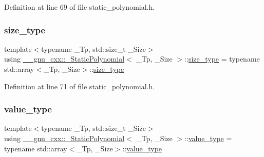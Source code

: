 Definition at line 69 of file static\+\_\+polynomial.\+h.

\mbox{\label{class____gnu__cxx_1_1__StaticPolynomial_a0cc0aa4adab35686ef2474e07f511ff9}} 
\subsubsection{\texorpdfstring{size\+\_\+type}{size\_type}}
{\footnotesize\ttfamily template$<$typename \+\_\+\+Tp, std\+::size\+\_\+t \+\_\+\+Size$>$ \\
using \hyperlink{class____gnu__cxx_1_1__StaticPolynomial}{\+\_\+\+\_\+gnu\+\_\+cxx\+::\+\_\+\+Static\+Polynomial}$<$ \+\_\+\+Tp, \+\_\+\+Size $>$\+::\hyperlink{class____gnu__cxx_1_1__StaticPolynomial_a0cc0aa4adab35686ef2474e07f511ff9}{size\+\_\+type} =  typename std\+::array$<$\+\_\+\+Tp, \+\_\+\+Size$>$\+::\hyperlink{class____gnu__cxx_1_1__StaticPolynomial_a0cc0aa4adab35686ef2474e07f511ff9}{size\+\_\+type}}



Definition at line 71 of file static\+\_\+polynomial.\+h.

\mbox{\label{class____gnu__cxx_1_1__StaticPolynomial_aad5f3d6d5876b6926b30724aeac649d6}} 
\subsubsection{\texorpdfstring{value\+\_\+type}{value\_type}}
{\footnotesize\ttfamily template$<$typename \+\_\+\+Tp, std\+::size\+\_\+t \+\_\+\+Size$>$ \\
using \hyperlink{class____gnu__cxx_1_1__StaticPolynomial}{\+\_\+\+\_\+gnu\+\_\+cxx\+::\+\_\+\+Static\+Polynomial}$<$ \+\_\+\+Tp, \+\_\+\+Size $>$\+::\hyperlink{class____gnu__cxx_1_1__StaticPolynomial_aad5f3d6d5876b6926b30724aeac649d6}{value\+\_\+type} =  typename std\+::array$<$\+\_\+\+Tp, \+\_\+\+Size$>$\+::\hyperlink{class____gnu__cxx_1_1__StaticPolynomial_aad5f3d6d5876b6926b30724aeac649d6}{value\+\_\+type}}

